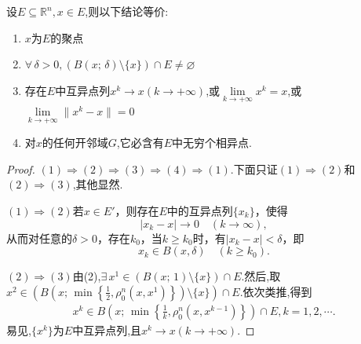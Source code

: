 \documentclass[../../main.tex]{subfiles}%
\begin{document}
\begin{theorem}\label{theorem:聚点的充要条件--实变函数}
设$E\subseteq\mathbb{R}^n,x\in E$,则以下结论等价:
\begin{enumerate}[(1)]
\item $x$为$E$的聚点

\item\label{theorem:聚点的充要条件--实变函数-2} $\forall\,\delta>0,(B(x;\,\delta)\setminus\{x\})\cap E\neq\varnothing$

\item 存在$E$中互异点列$x^k\to x(k\to+\infty)$,或$\lim\limits_{k\to+\infty}x^k=x$,或$\lim\limits_{k\to+\infty}\|x^k-x\|=0$

\item 对$x$的任何开邻域$G$,它必含有$E$中无穷个相异点.
\end{enumerate}
\end{theorem}
\begin{proof}
$(1)\Rightarrow(2)\Rightarrow(3)\Rightarrow(4)\Rightarrow(1)$.下面只证$(1)\Rightarrow(2)$和$(2)\Rightarrow(3)$,其他显然.

$(1)\Rightarrow(2)$若\(x\in E'\)，则存在\(E\)中的互异点列\(\{x_k\}\)，使得
\[|x_k - x|\to 0\quad(k\to\infty),\]
从而对任意的\(\delta>0\)，存在\(k_0\)，当\(k\geqslant k_0\)时，有\(|x_k - x|<\delta\)，即
\[x_k\in B(x,\delta)\quad(k\geqslant k_0).\]

$(2)\Rightarrow(3)$由(2),$\exists\,x^1\in(B(x;\,1)\setminus\{x\})\cap E$.然后,取$x^2\in\left(B\left(x;\,\min\left\{\frac{1}{2},\rho_0^n(x,x^1)\right\}\right)\setminus\{x\}\right)\cap E$.依次类推,得到
\begin{align*}
x^k\in B\left(x;\,\min\left\{\frac{1}{k},\rho_0^n(x,x^{k-1})\right\}\right)\cap E,k=1,2,\cdots.
\end{align*}
易见,$\{x^k\}$为$E$中互异点列,且$x^k\to x(k\to+\infty)$.
\end{proof}
\end{document}
